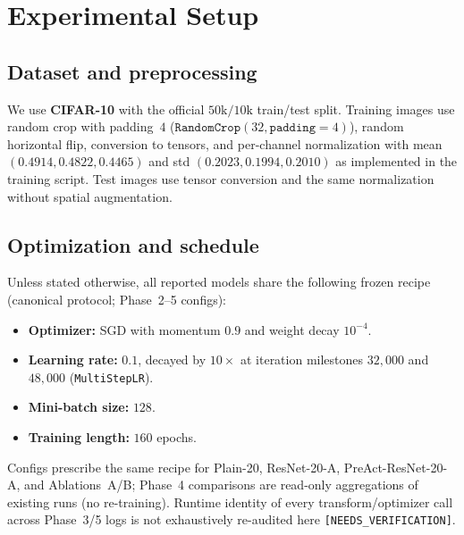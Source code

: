 \section{Experimental Setup}
\label{sec:setup}


\subsection{Dataset and preprocessing}
\label{sec:setup-data}

We use \textbf{CIFAR-10} with the official $50\mathrm{k}/10\mathrm{k}$ train/test split.
Training images use random crop with padding~$4$ ($\texttt{RandomCrop}(32,\texttt{padding}{=}4)$),
random horizontal flip, conversion to tensors, and per-channel normalization with
mean $(0.4914, 0.4822, 0.4465)$ and std $(0.2023, 0.1994, 0.2010)$
as implemented in the training script.
Test images use tensor conversion and the same normalization without spatial augmentation.

\subsection{Optimization and schedule}
\label{sec:setup-optim}

Unless stated otherwise, all reported models share the following frozen recipe
(canonical protocol; Phase~2--5 configs):
\begin{itemize}
  \item \textbf{Optimizer:} SGD with momentum $0.9$ and weight decay $10^{-4}$.
  \item \textbf{Learning rate:} $0.1$, decayed by $10\times$ at iteration milestones
        $32{,}000$ and $48{,}000$ (\texttt{MultiStepLR}).
  \item \textbf{Mini-batch size:} $128$.
  \item \textbf{Training length:} $160$ epochs.
\end{itemize}
Configs prescribe the same recipe for Plain-20, ResNet-20-A, PreAct-ResNet-20-A, and Ablations~A/B;
Phase~4 comparisons are read-only aggregations of existing runs (no re-training).
Runtime identity of every transform/optimizer call across Phase~3/5 logs is not exhaustively
re-audited here
\texttt{[NEEDS\_VERIFICATION]}.

